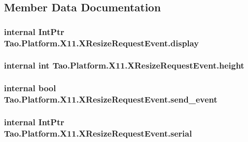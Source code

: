 \subsection{Member Data Documentation}
\hypertarget{struct_tao_1_1_platform_1_1_x11_1_1_x_resize_request_event_a34ead4dbb535f007d618b1a57eab531b}{
\subsubsection[{display}]{\setlength{\rightskip}{0pt plus 5cm}internal IntPtr {\bf Tao.Platform.X11.XResizeRequestEvent.display}}}
\label{struct_tao_1_1_platform_1_1_x11_1_1_x_resize_request_event_a34ead4dbb535f007d618b1a57eab531b}
\hypertarget{struct_tao_1_1_platform_1_1_x11_1_1_x_resize_request_event_af263ea7c56f2f5951d54a8321b58df61}{
\subsubsection[{height}]{\setlength{\rightskip}{0pt plus 5cm}internal int {\bf Tao.Platform.X11.XResizeRequestEvent.height}}}
\label{struct_tao_1_1_platform_1_1_x11_1_1_x_resize_request_event_af263ea7c56f2f5951d54a8321b58df61}
\hypertarget{struct_tao_1_1_platform_1_1_x11_1_1_x_resize_request_event_a790c87cce8caf1a8820fdf6918eed228}{
\subsubsection[{send\_\-event}]{\setlength{\rightskip}{0pt plus 5cm}internal bool {\bf Tao.Platform.X11.XResizeRequestEvent.send\_\-event}}}
\label{struct_tao_1_1_platform_1_1_x11_1_1_x_resize_request_event_a790c87cce8caf1a8820fdf6918eed228}
\hypertarget{struct_tao_1_1_platform_1_1_x11_1_1_x_resize_request_event_afdbba02f5fe8e7121d7727a17b541719}{
\subsubsection[{serial}]{\setlength{\rightskip}{0pt plus 5cm}internal IntPtr {\bf Tao.Platform.X11.XResizeRequestEvent.serial}}}
